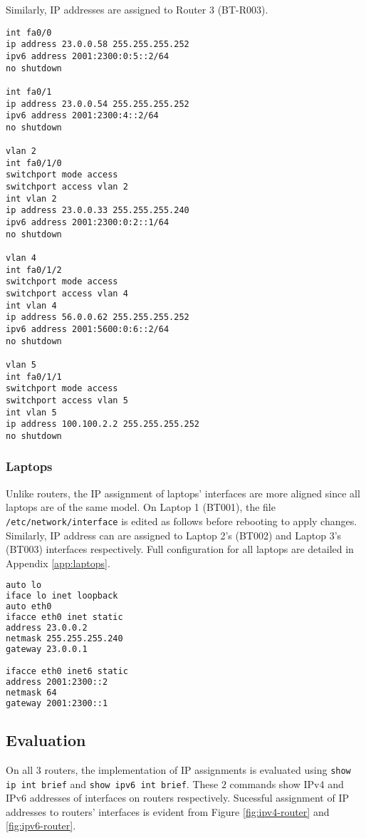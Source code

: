 Similarly, IP addresses are assigned to Router 3 (BT-R003).

\begin{lstlisting}
int fa0/0
ip address 23.0.0.58 255.255.255.252
ipv6 address 2001:2300:0:5::2/64
no shutdown

int fa0/1
ip address 23.0.0.54 255.255.255.252
ipv6 address 2001:2300:4::2/64
no shutdown

vlan 2
int fa0/1/0
switchport mode access
switchport access vlan 2
int vlan 2
ip address 23.0.0.33 255.255.255.240
ipv6 address 2001:2300:0:2::1/64
no shutdown

vlan 4
int fa0/1/2
switchport mode access
switchport access vlan 4
int vlan 4
ip address 56.0.0.62 255.255.255.252
ipv6 address 2001:5600:0:6::2/64
no shutdown

vlan 5
int fa0/1/1
switchport mode access
switchport access vlan 5
int vlan 5
ip address 100.100.2.2 255.255.255.252
no shutdown
\end{lstlisting}

\subsubsection{Laptops}

Unlike routers, the IP assignment of laptops' interfaces are more aligned since all laptops are of the same model. 
On Laptop 1 (BT001), the file \texttt{/etc/network/interface} is edited as follows before rebooting to apply changes. 
Similarly, IP address can are assigned to Laptop 2's (BT002) and Laptop 3's (BT003) interfaces respectively. 
Full configuration for all laptops are detailed in Appendix \ref{app:laptops}.

\begin{lstlisting}[language=sh]
auto lo
iface lo inet loopback
auto eth0
ifacce eth0 inet static 
address 23.0.0.2
netmask 255.255.255.240
gateway 23.0.0.1

ifacce eth0 inet6 static 
address 2001:2300::2
netmask 64
gateway 2001:2300::1
\end{lstlisting}

\subsection{Evaluation}

On all $3$ routers, the implementation of IP assignments is evaluated using \texttt{show ip int brief} and \texttt{show ipv6 int brief}. These $2$ commands show IPv4 and IPv6 addresses of interfaces on routers respectively.
Sucessful assignment of IP addresses to routers' interfaces is evident from Figure \ref{fig:ipv4-router} and \ref{fig:ipv6-router}.

